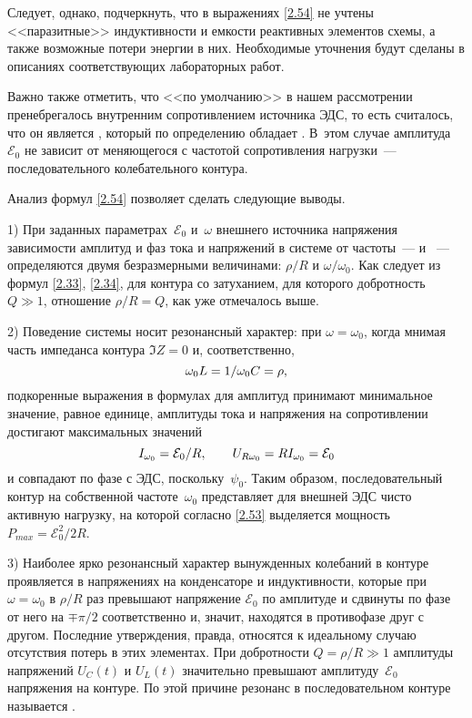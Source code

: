 Следует, однако, подчеркнуть, что в выражениях \eqref{2.54} не учтены
<<паразитные>> индуктивности и емкости реактивных элементов схемы, а также
возможные потери энергии в них. Необходимые уточнения будут сделаны в описаниях
соответствующих лабораторных работ.

Важно также отметить, что <<по умолчанию>> в нашем рассмотрении пренебрегалось
внутренним сопротивлением источника ЭДС, то есть считалось, что он является
, который по определению обладает
. В~этом случае амплитуда
$\mathcal{E}_0$ не зависит от меняющегося с частотой сопротивления
нагрузки~--- последовательного колебательного контура.

Анализ формул \eqref{2.54} позволяет сделать следующие выводы.

1) При заданных параметрах~$\mathcal{E}_0$ и~$\omega$ внешнего источника
напряжения зависимости амплитуд и фаз тока и напряжений в системе от
частоты~---  и ~--- определяются двумя безразмерными величинами: $\rho/R$ и
$\omega/\omega_0$. Как следует из формул \eqref{2.33}, \eqref{2.34}, для контура
со  затуханием, для которого добротность $Q\gg1$, отношение
$\rho/R=Q$, как уже отмечалось выше.

2) Поведение системы носит резонансный характер: при $\omega=\omega_0$, когда
мнимая часть импеданса контура $\Im Z=0$ и, соответственно,
\begin{equation}\eqmark{2.55}
	\omega_0L=1/\omega_0C=\rho,
\end{equation}
подкоренные выражения в формулах для амплитуд принимают минимальное значение,
равное единице, амплитуды тока и напряжения на сопротивлении достигают
максимальных значений
\begin{equation}\eqmark{2.56}
	I_{\omega_0}=\mathcal{E}_0/R, \qquad
U_{R\omega_0}=RI_{\omega_0}=\mathcal{E}_0
\end{equation}
и совпадают по фазе с ЭДС, поскольку~$\psi_0$. Таким образом, последовательный
контур на собственной частоте~$\omega_0$ представляет для внешней ЭДС чисто
активную нагрузку, на которой согласно \eqref{2.53} выделяется мощность
$P_{max}=\mathcal{E}_0^2/2R$.

3) Наиболее ярко резонансный характер вынужденных колебаний в
 контуре проявляется в напряжениях на конденсаторе и
индуктивности, которые при $\omega=\omega_0$ в $\rho/R$ раз превышают напряжение
$\mathcal{E}_0$ по амплитуде и сдвинуты по фазе от него на $\mp\pi/2$
соответственно и, значит, находятся в противофазе друг с другом. Последние
утверждения, правда, относятся к идеальному случаю отсутствия потерь в этих
элементах. При добротности $Q=\rho/R\gg1$ амплитуды напряжений $U_C(t)$ и
$U_L(t)$ значительно превышают амплитуду~$\mathcal{E}_0$ напряжения на контуре.
По этой причине резонанс в последовательном контуре называется
.

